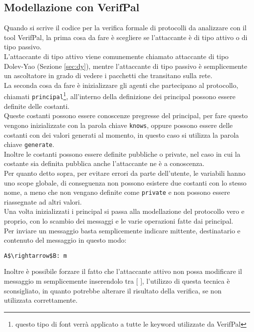 \subsection*{Modellazione con VerifPal}
Quando si scrive il codice per la verifica formale di protocolli da analizzare con il tool VerifPal, la prima cosa da fare è scegliere se l'attaccante è di tipo attivo o di tipo passivo.\\
L'attaccante di tipo attivo viene comunemente chiamato attaccante di tipo Dolev-Yao (Sezione \ref*{sec:dy}), mentre l'attaccante di tipo passivo è semplicemente un ascoltatore in grado di vedere i pacchetti che transitano sulla rete.\\
La seconda cosa da fare è inizializzare gli agenti che partecipano al protocollo, chiamati \texttt{principal}\footnote{questo tipo di font verrà applicato a tutte le keyword utilizzate da VerifPal}, all'interno della definizione dei principal possono essere definite delle costanti.\\ 
Queste costanti possono essere conoscenze pregresse del principal, per fare questo vengono inizializzate con la parola chiave \texttt{knows}, oppure possono essere delle costanti con dei valori generati al momento, in questo caso si utilizza la parola chiave \texttt{generate}.\\
Inoltre le costanti possono essere definite pubbliche o private, nel caso in cui la costante sia definita pubblica anche l'attaccante ne è a conoscenza.\\
Per quanto detto sopra, per evitare errori da parte dell'utente, le variabili hanno uno scope globale, di conseguenza non possono esistere due costanti con lo stesso nome, a meno che non vengano definite come \texttt{private} e non possono essere riassegnate ad altri valori.\\
Una volta inizializzati i principal si passa alla modellazione del protocollo vero e proprio, con lo scambio dei messaggi e le varie operazioni fatte dai principal.\\
Per inviare un messaggio basta semplicemente indicare mittente, destinatario e contenuto del messaggio in questo modo: 
\begin{lstlisting}[mathescape]
    A$\rightarrow$B: m 
\end{lstlisting}
 Inoltre è possibile forzare il fatto che l'attaccante attivo non possa modificare il messaggio m semplicemente inserendolo tra $[$ $]$, l'utilizzo di questa tecnica è sconsigliato, in quanto potrebbe alterare il risultato della verifica, se non utilizzata correttamente.\\
